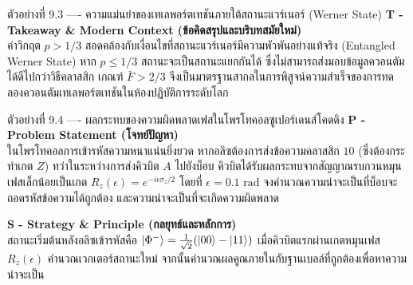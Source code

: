 \begin{psctbox}{ตัวอย่างที่ 9.3 ---- ความแม่นยำของเทเลพอร์ตเทชันภายใต้สถานะแวร์เนอร์ (Werner State)}
\vspace{4pt}
\noindent\textbf{T - Takeaway \& Modern Context (ข้อคิดสรุปและบริบทสมัยใหม่)} \\
ค่าวิกฤต $p > 1/3$ สอดคล้องกับเงื่อนไขที่สถานะแวร์เนอร์มีความพัวพันอย่างแท้จริง (Entangled Werner State) หาก $p \le 1/3$ สถานะจะเป็นสถานะแยกกันได้ ซึ่งไม่สามารถส่งมอบข้อมูลควอนตัมได้ดีไปกว่าวิธีคลาสสิก เกณฑ์ $\bar{F} > 2/3$ จึงเป็นมาตรฐานสากลในการพิสูจน์ความสำเร็จของการทดลองควอนตัมเทเลพอร์ตเทชันในห้องปฏิบัติการระดับโลก
\end{psctbox}

\begin{psctbox}{ตัวอย่างที่ 9.4 ---- ผลกระทบของความผิดพลาดเฟสในโพรโทคอลซูเปอร์เดนส์โคดดิง}
\noindent\textbf{P - Problem Statement (โจทย์ปัญหา)} \\
ในโพรโทคอลการเข้ารหัสความหนาแน่นยิ่งยวด หากอลิซต้องการส่งข้อความคลาสสิก $10$ (ซึ่งต้องกระทำเกต $Z$) ทว่าในระหว่างการส่งคิวบิต $A$ ไปยังบ็อบ คิวบิตได้รับผลกระทบจากสัญญาณรบกวนหมุนเฟสเล็กน้อยเป็นเกต $R_z(\epsilon) = e^{-i\epsilon\sigma_z/2}$ โดยที่ $\epsilon = 0.1\text{ rad}$ จงคำนวณความน่าจะเป็นที่บ็อบจะถอดรหัสข้อความได้ถูกต้อง และความน่าจะเป็นที่จะเกิดความผิดพลาด

\vspace{4pt}
\noindent\textbf{S - Strategy \& Principle (กลยุทธ์และหลักการ)} \\
สถานะเริ่มต้นหลังอลิซเข้ารหัสคือ $\ket{\Phi^-} = \frac{1}{\sqrt{2}}(\ket{00}-\ket{11})$ เมื่อคิวบิตแรกผ่านเกตหมุนเฟส $R_z(\epsilon)$ คำนวณเวกเตอร์สถานะใหม่ จากนั้นคำนวณผลคูณภายในกับฐานเบลล์ที่ถูกต้องเพื่อหาความน่าจะเป็น


\end{psctbox}
